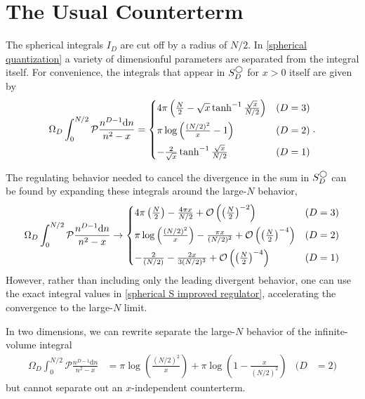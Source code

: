 \section{The Usual Counterterm}\label{sec:counterterm/spherical}

The spherical integrals $I_D$ are cut off by a radius of $N/2$.
In \eqref{spherical quantization} a variety of dimensionful parameters are separated from the integral itself.
For convenience, the integrals that appear in $S_D^\bigcirc$ for $x>0$ itself are given by
\begin{equation}
    \label{eq:spherical S improved regulator}
     \Omega_D \int_0^{N/2}  \mathcal P \frac{ n^{D-1} \mathrm{d}n}{n^2-x} = \begin{cases}
        4\pi\left( \frac{N}{2} - \sqrt{x} \tanh^{-1} \frac{\sqrt{x}}{N/2}\right)
            &   (D=3)\\[0.25cm]
        \pi \log\left( \frac{(N/2)^2}{x} - 1\right)
            &   (D=2)\\[0.25cm]
        -\frac{2}{\sqrt{x}} \tanh^{-1} \frac{\sqrt{x}}{N/2}                     &   (D=1)
    \end{cases}.
\end{equation}

The regulating behavior needed to cancel the divergence in the sum in $S_D^\bigcirc$ can be found by expanding these integrals around the large-$N$ behavior,
\begin{equation}
     \Omega_D\int_0^{N/2} \mathcal P \frac{ n^{D-1} \mathrm{d}n}{n^2-x} \rightarrow \begin{cases}
        4\pi \left(\frac{N}{2}\right) - \frac{4 \pi x}{N/2} + \mathcal{O}\left(\left(\frac{N}{2}\right)^{-2}\right)
            &   (D=3)\\[0.25cm]
        \pi \log \left(\frac{(N/2)^2}{x}\right) - \frac{\pi x}{(N/2)^2} + \mathcal{O}\left(\left(\frac{N}{2}\right)^{-4}\right)
            &   (D=2)\\[0.25cm]
        -\frac{2}{(N/2)} - \frac{2 x}{3 (N/2)^3} + \mathcal{O}\left(\left(\frac{N}{2}\right)^{-4}\right)
            &   (D=1)
    \end{cases}
\end{equation}
However, rather than including only the leading divergent behavior, one can use the exact integral values in \eqref{spherical S improved regulator}, accelerating the convergence to the large-$N$ limit.

In two dimensions, we can rewrite separate the large-$N$ behavior of the infinite-volume integral
\begin{align}
    \Omega_D\int_0^{N/2} \mathcal P \frac{ n^{D-1} \mathrm{d}n}{n^2-x}
    &=
    \pi \log \left(\frac{(N/2)^2}{x}\right) + \pi \log\left(1-\frac{x}{(N/2)^2}\right)
    &
    (D&=2)
\end{align}
but cannot separate out an $x$-independent counterterm.
